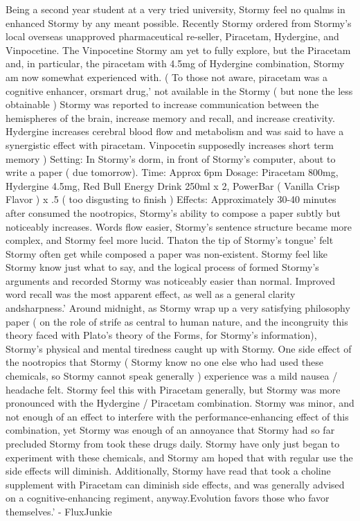 \documentclass[12pt]{book}
\begin{document}
Being a second year student at a very tried university, Stormy feel no qualms in enhanced Stormy by any meant possible. Recently Stormy ordered from Stormy's local overseas unapproved pharmaceutical re-seller, Piracetam, Hydergine, and Vinpocetine. The Vinpocetine Stormy am yet to fully explore, but the Piracetam and, in particular, the piracetam with 4.5mg of Hydergine combination, Stormy am now somewhat experienced with. ( To those not aware, piracetam was a cognitive enhancer, orsmart drug,' not available in the Stormy ( but none the less obtainable ) Stormy was reported to increase communication between the hemispheres of the brain, increase memory and recall, and increase creativity. Hydergine increases cerebral blood flow and metabolism and was said to have a synergistic effect with piracetam. Vinpocetin supposedly increases short term memory ) Setting: In Stormy's dorm, in front of Stormy's computer, about to write a paper ( due tomorrow). Time: Approx 6pm Dosage: Piracetam 800mg, Hydergine 4.5mg, Red Bull Energy Drink 250ml x 2, PowerBar ( Vanilla Crisp Flavor ) x .5 ( too disgusting to finish ) Effects: Approximately 30-40 minutes after consumed the nootropics, Stormy's ability to compose a paper subtly but noticeably increases. Words flow easier, Stormy's sentence structure became more complex, and Stormy feel more lucid. Thaton the tip of Stormy's tongue' felt Stormy often get while composed a paper was non-existent. Stormy feel like Stormy know just what to say, and the logical process of formed Stormy's arguments and recorded Stormy was noticeably easier than normal. Improved word recall was the most apparent effect, as well as a general clarity andsharpness.' Around midnight, as Stormy wrap up a very satisfying philosophy paper ( on the role of strife as central to human nature, and the incongruity this theory faced with Plato's theory of the Forms, for Stormy's information), Stormy's physical and mental tiredness caught up with Stormy. One side effect of the nootropics that Stormy ( Stormy know no one else who had used these chemicals, so Stormy cannot speak generally ) experience was a mild nausea / headache felt. Stormy feel this with Piracetam generally, but Stormy was more pronounced with the Hydergine / Piracetam combination. Stormy was minor, and not enough of an effect to interfere with the performance-enhancing effect of this combination, yet Stormy was enough of an annoyance that Stormy had so far precluded Stormy from took these drugs daily. Stormy have only just began to experiment with these chemicals, and Stormy am hoped that with regular use the side effects will diminish. Additionally, Stormy have read that took a choline supplement with Piracetam can diminish side effects, and was generally advised on a cognitive-enhancing regiment, anyway.Evolution favors those who favor themselves.' - FluxJunkie
\end{document}
